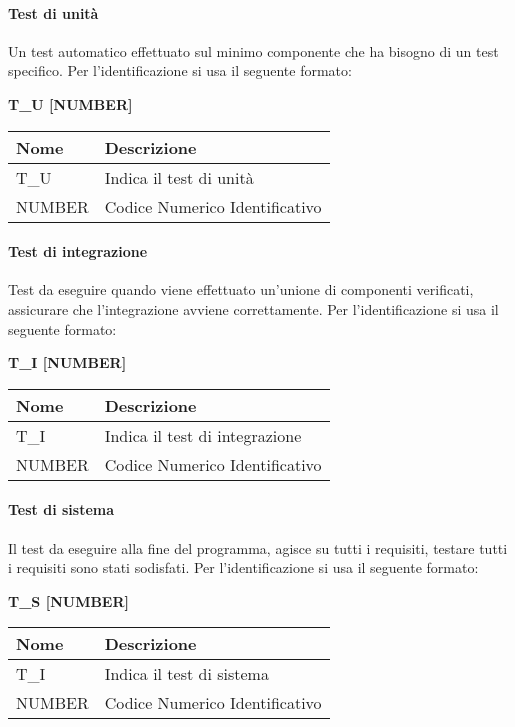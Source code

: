 \paragraph{Test di unità} \hfill \break
Un test automatico effettuato sul minimo componente che ha bisogno di un test specifico.\newline
Per l’identificazione si usa il seguente formato:
\begin{center}
    \textbf{T\_U [NUMBER]}
\end{center}
\renewcommand{\arraystretch}{1.8} 
 \begin{tabular}{ |m{7em}|m{30em}| }
        \hline 
        \textbf{Nome} & \textbf{Descrizione} \\
        \hline
            T\_U & Indica il test di unità \\
        \hline
            NUMBER & Codice Numerico Identificativo \\
        \hline
 \end{tabular}

\paragraph{Test di integrazione}  \hfill \break
Test da eseguire quando viene effettuato un'unione di componenti verificati, assicurare che l’integrazione avviene correttamente.
Per l’identificazione si usa il seguente formato:
\begin{center}
    \textbf{T\_I [NUMBER]}
\end{center}
\renewcommand{\arraystretch}{1.8} 
 \begin{tabular}{ |m{7em}|m{30em}| }
        \hline
        \textbf{Nome} & \textbf{Descrizione} \\
        \hline
            T\_I & Indica il test di integrazione \\
        \hline
            NUMBER & Codice Numerico Identificativo \\
        \hline
 \end{tabular}

\paragraph{Test di sistema}  \hfill \break
Il test da eseguire alla fine del programma, agisce su tutti i requisiti, testare tutti i requisiti sono stati sodisfati.
Per l’identificazione si usa il seguente formato:
\begin{center}
    \textbf{T\_S [NUMBER]}
\end{center}
\renewcommand{\arraystretch}{1.8} 
 \begin{tabular}{ |m{7em}|m{30em}| }
        \hline
        \textbf{Nome} & \textbf{Descrizione} \\
        \hline
            T\_I & Indica il test di sistema \\
        \hline
            NUMBER & Codice Numerico Identificativo \\
        \hline
 \end{tabular}

